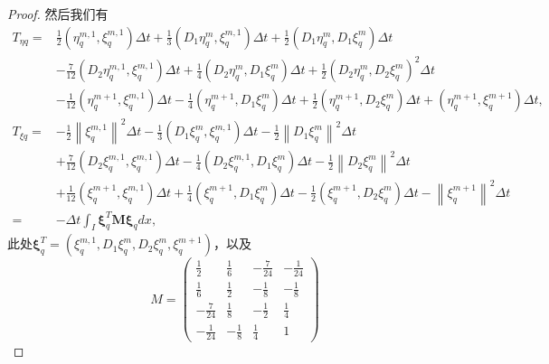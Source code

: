 \begin{proof}
    然后我们有$$
        \begin{aligned}
            T_{\eta q}= & \frac{1}{2}\left(\eta_{q}^{m, 1}, \xi_{q}^{m, 1}\right) \Delta t+\frac{1}{3}\left(D_{1} \eta_{q}^{m}, \xi_{q}^{m, 1}\right) \Delta t+\frac{1}{2}\left(D_{1} \eta_{q}^{m}, D_{1} \xi_{q}^{m}\right) \Delta t                                                  \\
                        & -\frac{7}{12}\left(D_{2} \eta_{q}^{m, 1}, \xi_{q}^{m, 1}\right) \Delta t+\frac{1}{4}\left(D_{2} \eta_{q}^{m}, D_{1} \xi_{q}^{m}\right) \Delta t+\frac{1}{2}\left(D_{2} \eta_{q}^{m}, D_{2} \xi_{q}^{m}\right)^{2} \Delta t                                   \\
                        & -\frac{1}{12}\left(\eta_{q}^{m+1}, \xi_{q}^{m, 1}\right) \Delta t-\frac{1}{4}\left(\eta_{q}^{m+1}, D_{1} \xi_{q}^{m}\right) \Delta t+\frac{1}{2}\left(\eta_{q}^{m+1}, D_{2} \xi_{q}^{m}\right) \Delta t+\left(\eta_{q}^{m+1}, \xi_{q}^{m+1}\right) \Delta t, \\
            T_{\xi q}=  & -\frac{1}{2}\left\|\xi_{q}^{m, 1}\right\|^{2} \Delta t-\frac{1}{3}\left(D_{1} \xi_{q}^{m}, \xi_{q}^{m, 1}\right) \Delta t-\frac{1}{2}\left\|D_{1} \xi_{q}^{m}\right\|^{2} \Delta t                                                                           \\
                        & +\frac{7}{12}\left(D_{2} \xi_{q}^{m, 1}, \xi_{q}^{m, 1}\right) \Delta t-\frac{1}{4}\left(D_{2} \xi_{q}^{m, 1}, D_{1} \xi_{q}^{m}\right) \Delta t-\frac{1}{2}\left\|D_{2} \xi_{q}^{m}\right\|^{2} \Delta t                                                    \\
                        & +\frac{1}{12}\left(\xi_{q}^{m+1}, \xi_{q}^{m, 1}\right) \Delta t+\frac{1}{4}\left(\xi_{q}^{m+1}, D_{1} \xi_{q}^{m}\right) \Delta t-\frac{1}{2}\left(\xi_{q}^{m+1}, D_{2} \xi_{q}^{m}\right) \Delta t-\left\|\xi_{q}^{m+1}\right\|^{2} \Delta t               \\
            =           & -\Delta t \int_{I} \boldsymbol{\xi}_{q}^{T} \boldsymbol{M} \boldsymbol{\xi}_{q} d x,
        \end{aligned}
    $$
    此处$\boldsymbol{\xi}_{q}^{T}=\left(\xi_{q}^{m, 1}, D_{1} \xi_{q}^{m}, D_{2} \xi_{q}^{m}, \xi_{q}^{m+1}\right)$，以及
    $$
        M=\left(\begin{array}{cccc}
                \frac{1}{2}   & \frac{1}{6}  & -\frac{7}{24} & -\frac{1}{24} \\
                \frac{1}{6}   & \frac{1}{2}  & -\frac{1}{8}  & -\frac{1}{8}  \\
                -\frac{7}{24} & \frac{1}{8}  & -\frac{1}{2}  & \frac{1}{4}   \\
                -\frac{1}{24} & -\frac{1}{8} & \frac{1}{4}   & 1
            \end{array}\right)
    $$


\end{proof}
